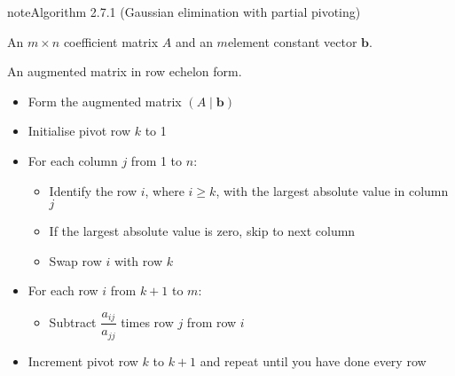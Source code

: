 \documentclass[letterpaper,10pt,english]{jupyterBook}
\begin{document}
\ignorespaces \label{_pages/2.4_Partial_pivoting:ge-pp-algorithm}
\begin{sphinxadmonition}{note}{Algorithm 2.7.1 (Gaussian elimination with partial pivoting)}



\sphinxAtStartPar
{} An \(m \times n\) coefficient matrix \(A\) and an \(m\)\sphinxhyphen{}element constant vector \(\mathbf{b}\).

\sphinxAtStartPar
{} An augmented matrix in row echelon form.
\begin{itemize}
\item {} 
\sphinxAtStartPar
Form the augmented matrix \(( A \mid \mathbf{b} )\)

\item {} 
\sphinxAtStartPar
Initialise pivot row \(k\) to 1

\item {} 
\sphinxAtStartPar
For each column \(j\) from 1 to \(n\):
\begin{itemize}
\item {} 
\sphinxAtStartPar
Identify the row \(i\), where \(i \geq k\), with the largest absolute value in column \(j\)

\item {} 
\sphinxAtStartPar
If the largest absolute value is zero, skip to next column

\item {} 
\sphinxAtStartPar
Swap row \(i\) with row \(k\)

\end{itemize}

\item {} 
\sphinxAtStartPar
For each row \(i\) from \(k+1\) to \(m\):
\begin{itemize}
\item {} 
\sphinxAtStartPar
Subtract \(\dfrac{a_{ij}}{a_{jj}}\) times row \(j\) from row \(i\)

\end{itemize}

\item {} 
\sphinxAtStartPar
Increment pivot row \(k\) to \(k+1\) and repeat until you have done every row

\end{itemize}
\end{sphinxadmonition}
\end{document}
